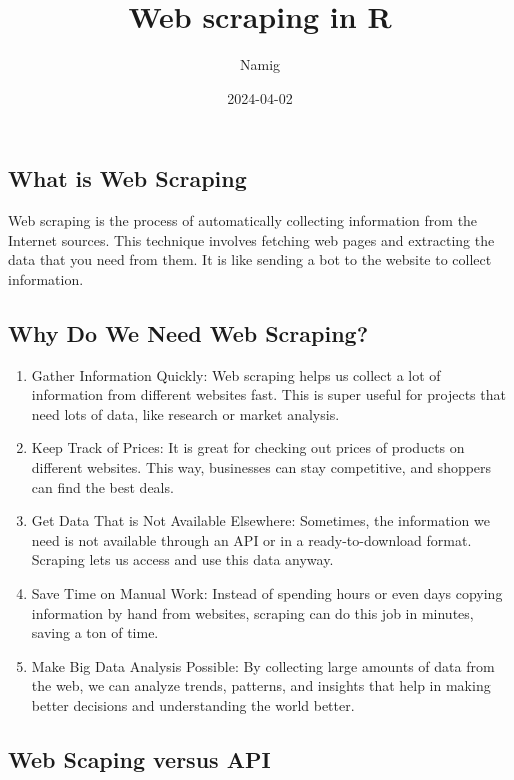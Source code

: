 \documentclass[
]{article}
\title{Web scraping in R}
\author{Namig}
\date{2024-04-02}
\begin{document}
\maketitle

\hypertarget{what-is-web-scraping}{%
\subsection{What is Web Scraping}\label{what-is-web-scraping}}

Web scraping is the process of automatically collecting information from
the Internet sources. This technique involves fetching web pages and
extracting the data that you need from them. It is like sending a bot to
the website to collect information.

\hypertarget{why-do-we-need-web-scraping}{%
\subsection{Why Do We Need Web
Scraping?}\label{why-do-we-need-web-scraping}}

\begin{enumerate}
\def\labelenumi{\arabic{enumi}.}
\item
  Gather Information Quickly: Web scraping helps us collect a lot of
  information from different websites fast. This is super useful for
  projects that need lots of data, like research or market analysis.
\item
  Keep Track of Prices: It is great for checking out prices of products
  on different websites. This way, businesses can stay competitive, and
  shoppers can find the best deals.
\item
  Get Data That is Not Available Elsewhere: Sometimes, the information
  we need is not available through an API or in a ready-to-download
  format. Scraping lets us access and use this data anyway.
\item
  Save Time on Manual Work: Instead of spending hours or even days
  copying information by hand from websites, scraping can do this job in
  minutes, saving a ton of time.
\item
  Make Big Data Analysis Possible: By collecting large amounts of data
  from the web, we can analyze trends, patterns, and insights that help
  in making better decisions and understanding the world better.
\end{enumerate}

\hypertarget{web-scaping-versus-api}{%
\subsection{Web Scaping versus API}\label{web-scaping-versus-api}}
\end{document}
